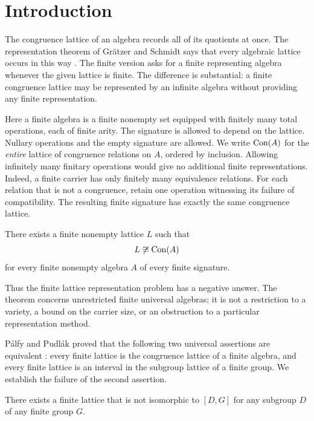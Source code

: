 \section{Introduction}\label{sec:introduction}

The congruence lattice of an algebra records all of its quotients at once.
The representation theorem of Gr\"atzer and Schmidt says that every
algebraic lattice occurs in this way \cite[Theorem~I, p.~34]{GratzerSchmidt1963}.
The finite version asks for a finite representing algebra whenever the
given lattice is finite. The difference is substantial: a finite
congruence lattice may be represented by an infinite algebra without
providing any finite representation.

Here a finite algebra is a finite nonempty set equipped with finitely many
total operations, each of finite arity. The signature is allowed to
depend on the lattice. Nullary operations and the empty signature are
allowed. We write $\operatorname{Con}(A)$ for the \emph{entire} lattice of congruence
relations on $A$, ordered by inclusion.
Allowing infinitely many finitary operations would give no additional
finite representations. Indeed, a finite carrier has only finitely many
equivalence relations. For each relation that is not a congruence, retain
one operation witnessing its failure of compatibility. The resulting
finite signature has exactly the same congruence lattice.

\begin{theorem}\label{main:congruences}
There exists a finite nonempty lattice $L$ such that
\[
 L\not\cong\operatorname{Con}(A)
\]
for every finite nonempty algebra $A$ of every finite signature.
\end{theorem}

Thus the finite lattice representation problem has a negative answer.
The theorem concerns unrestricted finite universal algebras; it is not
a restriction to a variety, a bound on the carrier size, or an obstruction
to a particular representation method.

P\'alfy and Pudl\'ak proved that the following two universal assertions
are equivalent \cite[Theorem~2]{PalfyPudlak1980}:
every finite lattice is the congruence lattice of a finite algebra, and
every finite lattice is an interval in the subgroup lattice of a finite
group. We establish the failure of the second assertion.

\begin{theorem}\label{main:group}
There exists a finite lattice that is not isomorphic to $[D,G]$ for any
subgroup $D$ of any finite group $G$.
\end{theorem}

